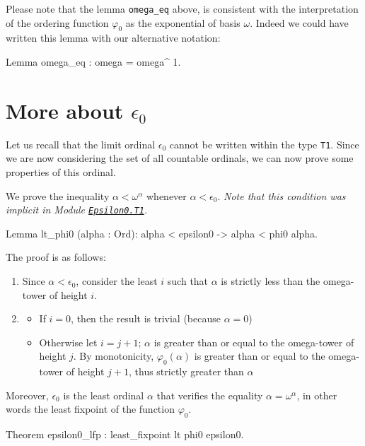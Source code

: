 \documentclass[a4paper]{book}
\begin{document}
{Please note that the lemma \texttt{omega\_eq} above, is consistent with the interpretation of the ordering function $\varphi_0$ as the exponential of basis $\omega$. Indeed we could have written this lemma with our alternative notation:

\begin{Coqsrc}
 Lemma omega_eq : omega = omega^ 1.
\end{Coqsrc}

\section{More about \texorpdfstring{$\epsilon_0$}{\texttt{epsilon0}}}

Let us recall that the limit ordinal  $\epsilon_0$ cannot be written within the type \texttt{T1}. Since we are now considering the set of all countable ordinals, we can now prove some properties of this ordinal.


We prove the inequality  $\alpha<\omega^\alpha$ whenever $\alpha < \epsilon_0$.
\emph{Note that this condition was implicit in Module \href{../src/html/hydras.Epsilon0/T1.html\#lt_phi0}%
{\texttt{Epsilon0.T1}}.}

\begin{Coqsrc}
Lemma lt_phi0 (alpha : Ord):
  alpha < epsilon0 -> alpha < phi0 alpha.
\end{Coqsrc}

The proof is as follows:
\begin{enumerate}
\item Since $\alpha<\epsilon_0$, consider the least $i$ such that $\alpha$ is strictly less than the omega-tower of height $i$.
\item
  \begin{itemize}
  \item If $i=0$, then the result is trivial (because $\alpha=0$)
 \item  Otherwise let $i=j+1$; 
          $\alpha$ is greater than or equal to the omega-tower of height $j$.
         By monotonicity,  $\varphi_0(\alpha)$ is greater than or equal to 
        the omega-tower of height $j+1$, thus strictly greater than $\alpha$
  \end{itemize}
 \end{enumerate}

Moreover,  $\epsilon_0$ is the least ordinal $\alpha$ that verifies the equality 
$\alpha = \omega^\alpha$, in other words the least fixpoint of the function  $\varphi_0$.

\begin{Coqsrc}
Theorem epsilon0_lfp : least_fixpoint lt phi0 epsilon0.
\end{Coqsrc}


}
\end{document}
